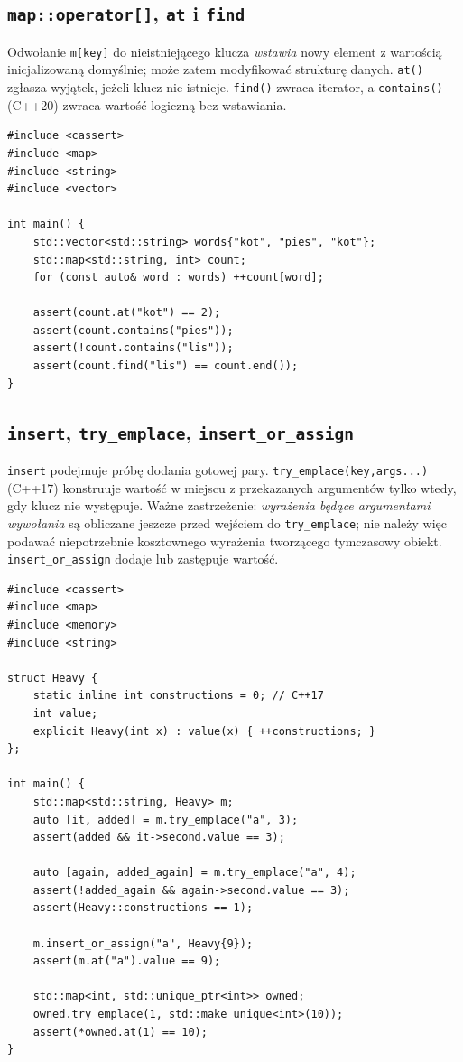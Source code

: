 \subsection{\texttt{map::operator[]}, \texttt{at} i \texttt{find}}

Odwołanie \texttt{m[key]} do nieistniejącego klucza \emph{wstawia} nowy
element z wartością inicjalizowaną domyślnie; może zatem modyfikować
strukturę danych. \texttt{at()} zgłasza wyjątek, jeżeli klucz nie
istnieje. \texttt{find()} zwraca iterator, a \texttt{contains()} (C++20)
zwraca wartość logiczną bez wstawiania.

\begin{lstlisting}[caption={Liczenie czestosci slow z map (C++20); kompletny program.}]
#include <cassert>
#include <map>
#include <string>
#include <vector>

int main() {
    std::vector<std::string> words{"kot", "pies", "kot"};
    std::map<std::string, int> count;
    for (const auto& word : words) ++count[word];

    assert(count.at("kot") == 2);
    assert(count.contains("pies"));
    assert(!count.contains("lis"));
    assert(count.find("lis") == count.end());
}
\end{lstlisting}

\subsection{\texttt{insert}, \texttt{try\_emplace}, \texttt{insert\_or\_assign}}

\texttt{insert} podejmuje próbę dodania gotowej pary.
\texttt{try\_emplace(key,args...)} (C++17) konstruuje wartość
w miejscu z przekazanych argumentów tylko wtedy, gdy klucz nie występuje.
Ważne zastrzeżenie: \emph{wyrażenia będące argumentami wywołania}
są obliczane jeszcze przed wejściem do \texttt{try\_emplace}; nie
należy więc podawać niepotrzebnie kosztownego wyrażenia tworzącego
tymczasowy obiekt. \texttt{insert\_or\_assign} dodaje lub zastępuje wartość.

\begin{lstlisting}[caption={Rozne operacje modyfikacji map (C++17); kompletny program.}]
#include <cassert>
#include <map>
#include <memory>
#include <string>

struct Heavy {
    static inline int constructions = 0; // C++17
    int value;
    explicit Heavy(int x) : value(x) { ++constructions; }
};

int main() {
    std::map<std::string, Heavy> m;
    auto [it, added] = m.try_emplace("a", 3);
    assert(added && it->second.value == 3);

    auto [again, added_again] = m.try_emplace("a", 4);
    assert(!added_again && again->second.value == 3);
    assert(Heavy::constructions == 1);

    m.insert_or_assign("a", Heavy{9});
    assert(m.at("a").value == 9);

    std::map<int, std::unique_ptr<int>> owned;
    owned.try_emplace(1, std::make_unique<int>(10));
    assert(*owned.at(1) == 10);
}
\end{lstlisting}

